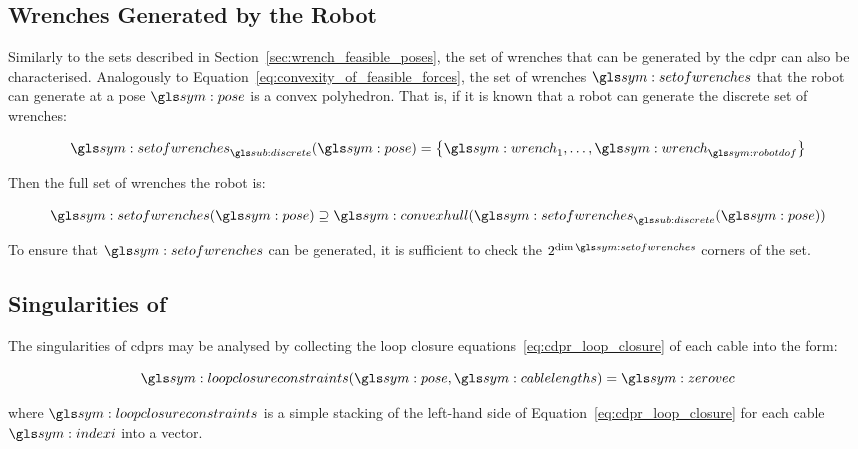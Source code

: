         \subsection{Wrenches Generated by the Robot}%
        \label{sec:wrenches_generated_by_the_robot}

            Similarly to the sets described in
			Section~\ref{sec:wrench_feasible_poses}, the set  of  wrenches	that
			can be generated  by  the  \gls{cdpr}  can	also  be  characterised.
			Analogously to	Equation~\ref{eq:convexity_of_feasible_forces},  the
			set of wrenches $\setofwrenches$ that the robot can  generate  at  a
			pose $\pose$ is a convex polyhedron.  That is, if it is known that a
			robot	can    generate    the	  discrete	  set	 of    wrenches:

            \begin{equation}
                \setofwrenches_{\discrete}(\pose) =
                    \left\{
                        \wrench_1, \ldots, \wrench_{\robotdof}
                    \right\}
            \end{equation}

            Then the full set of wrenches the robot is:

            \begin{equation}
                \setofwrenches(\pose) \supseteq \convexhull(\setofwrenches_{\discrete}(\pose))
            \end{equation}

			To ensure that $\setofwrenches$ can be generated, it  is  sufficient
			to	check  the	$2^{\dim\setofwrenches}$   corners	 of   the	set.

    \subsection{Singularities of }%
    \label{sec:singularities_of_cdprs}

		The singularities of \glspl{cdpr} may be analysed by collecting the loop
		closure equations~\ref{eq:cdpr_loop_closure}  of  each	cable  into  the
        form:

        \begin{equation}
            \loopclosureconstraints(\pose,\cablelengths) = \zerovec
        \end{equation}

		where $\loopclosureconstraints$ is a simple stacking  of  the  left-hand
		side of Equation~\ref{eq:cdpr_loop_closure}  for  each	cable  $\indexi$
        into a vector.

